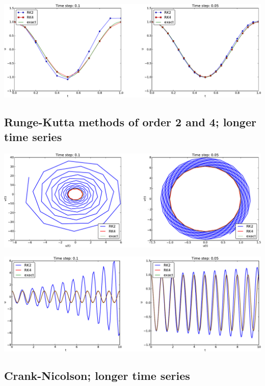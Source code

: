 \documentclass[%
oneside,                 %
final,                   %
10pt]{article}
\begin{document}
\centerline{\includegraphics[width=1.0\linewidth]{fig-vib/vib_RK_1_u.pdf}}



\subsection*{Runge-Kutta methods of order 2 and 4; longer time series}



\centerline{\includegraphics[width=1.0\linewidth]{fig-vib/vib_RK_10_pp.pdf}}





\centerline{\includegraphics[width=1.0\linewidth]{fig-vib/vib_RK_10_u.pdf}}



\subsection*{Crank-Nicolson; longer time series}
\end{document}
